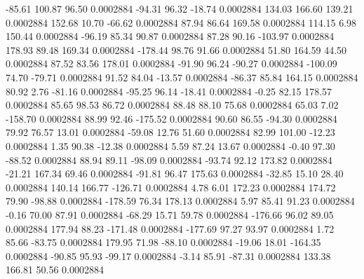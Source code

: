       -85.61      100.87       96.50     0.0002884
      -94.31       96.32      -18.74     0.0002884
      134.03      166.60      139.21     0.0002884
      152.68       10.70      -66.62     0.0002884
       87.94       86.64      169.58     0.0002884
      114.15        6.98      150.44     0.0002884
      -96.19       85.34       90.87     0.0002884
       87.28       90.16     -103.97     0.0002884
      178.93       89.48      169.34     0.0002884
     -178.44       98.76       91.66     0.0002884
       51.80      164.59       44.50     0.0002884
       87.52       83.56      178.01     0.0002884
      -91.90       96.24      -90.27     0.0002884
     -100.09       74.70      -79.71     0.0002884
       91.52       84.04      -13.57     0.0002884
      -86.37       85.84      164.15     0.0002884
       80.92        2.76      -81.16     0.0002884
      -95.25       96.14      -18.41     0.0002884
       -0.25       82.15      178.57     0.0002884
       85.65       98.53       86.72     0.0002884
       88.48       88.10       75.68     0.0002884
       65.03        7.02     -158.70     0.0002884
       88.99       92.46     -175.52     0.0002884
       90.60       86.55      -94.30     0.0002884
       79.92       76.57       13.01     0.0002884
      -59.08       12.76       51.60     0.0002884
       82.99      101.00      -12.23     0.0002884
        1.35       90.38      -12.38     0.0002884
        5.59       87.24       13.67     0.0002884
       -0.40       97.30      -88.52     0.0002884
       88.94       89.11      -98.09     0.0002884
      -93.74       92.12      173.82     0.0002884
      -21.21      167.34       69.46     0.0002884
      -91.81       96.47      175.63     0.0002884
      -32.85       15.10       28.40     0.0002884
      140.14      166.77     -126.71     0.0002884
        4.78        6.01      172.23     0.0002884
      174.72       79.90      -98.88     0.0002884
     -178.59       76.34      178.13     0.0002884
        5.97       85.41       91.23     0.0002884
       -0.16       70.00       87.91     0.0002884
      -68.29       15.71       59.78     0.0002884
     -176.66       96.02       89.05     0.0002884
      177.94       88.23     -171.48     0.0002884
     -177.69       97.27       93.97     0.0002884
        1.72       85.66      -83.75     0.0002884
      179.95       71.98      -88.10     0.0002884
      -19.06       18.01     -164.35     0.0002884
      -90.85       95.93      -99.17     0.0002884
       -3.14       85.91      -87.31     0.0002884
      133.38      166.81       50.56     0.0002884
